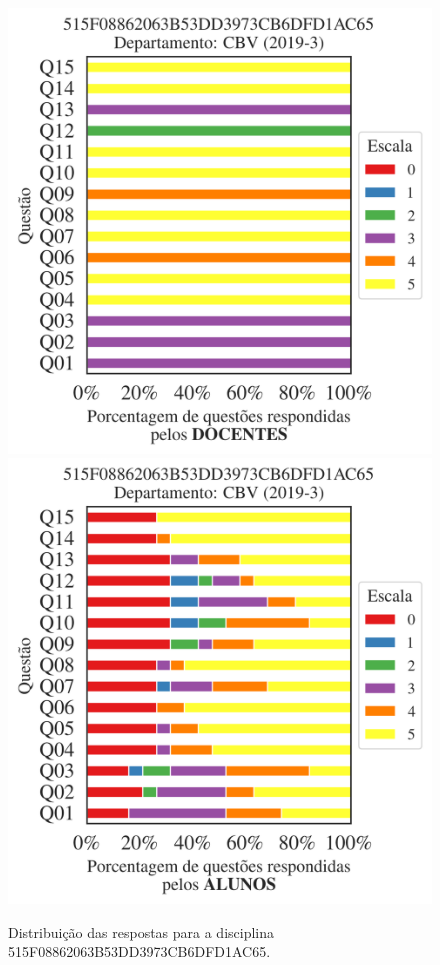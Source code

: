 \documentclass[a4paper,10pt]{article}
\begin{document}
\begin{figure}[h]
\centering
\includegraphics[width=0.485\linewidth]{analise_disciplina_departamento_CBV_515F08862063B53DD3973CB6DFD1AC65_docentes.png}
\includegraphics[width=0.485\linewidth]{analise_disciplina_departamento_CBV_515F08862063B53DD3973CB6DFD1AC65_alunos.png}
\caption{\label{fig:analise_geral_departamento}                Distribuição das respostas para a disciplina 515F08862063B53DD3973CB6DFD1AC65. }
\end{figure}
\end{document}
